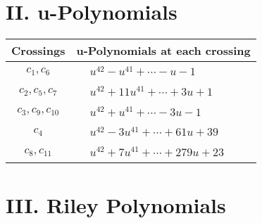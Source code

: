 \documentclass[1p]{elsarticle_modified}
\theoremstyle{definition}
\begin{document}
\newpage\renewcommand{\arraystretch}{1}
\centering \section*{ II. u-Polynomials}
\begin{tabular}{m{50pt}|m{274pt}}
Crossings & \hspace{64pt}u-Polynomials at each crossing \\
\hline $$\begin{aligned}c_{1},c_{6}\end{aligned}$$&$\begin{aligned}
&u^{42}- u^{41}+\cdots- u-1
\end{aligned}$\\
\hline $$\begin{aligned}c_{2},c_{5},c_{7}\end{aligned}$$&$\begin{aligned}
&u^{42}+11 u^{41}+\cdots+3 u+1
\end{aligned}$\\
\hline $$\begin{aligned}c_{3},c_{9},c_{10}\end{aligned}$$&$\begin{aligned}
&u^{42}+u^{41}+\cdots-3 u-1
\end{aligned}$\\
\hline $$\begin{aligned}c_{4}\end{aligned}$$&$\begin{aligned}
&u^{42}-3 u^{41}+\cdots+61 u+39
\end{aligned}$\\
\hline $$\begin{aligned}c_{8},c_{11}\end{aligned}$$&$\begin{aligned}
&u^{42}+7 u^{41}+\cdots+279 u+23
\end{aligned}$\\
\hline
\end{tabular}\newpage\renewcommand{\arraystretch}{1}
\centering \section*{ III. Riley Polynomials}
\end{document}
